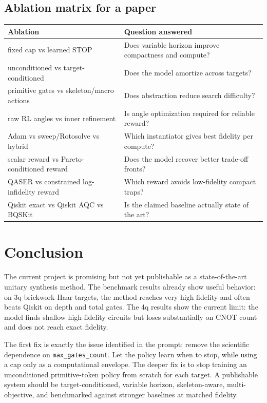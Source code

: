 \documentclass[11pt,a4paper]{article}
\begin{document}
\subsection{Ablation matrix for a paper}

\begin{center}
\small
\begin{tabularx}{\textwidth}{lX}
\toprule
Ablation & Question answered \\
\midrule
fixed cap vs learned STOP & Does variable horizon improve compactness and compute? \\
unconditioned vs target-conditioned & Does the model amortize across targets? \\
primitive gates vs skeleton/macro actions & Does abstraction reduce search difficulty? \\
raw RL angles vs inner refinement & Is angle optimization required for reliable reward? \\
Adam vs sweep/Rotosolve vs hybrid & Which instantiator gives best fidelity per compute? \\
scalar reward vs Pareto-conditioned reward & Does the model recover better trade-off fronts? \\
QASER vs constrained log-infidelity reward & Which reward avoids low-fidelity compact traps? \\
Qiskit exact vs Qiskit AQC vs BQSKit & Is the claimed baseline actually state of the art? \\
\bottomrule
\end{tabularx}
\end{center}

\section{Conclusion}

The current project is promising but not yet publishable as a state-of-the-art
unitary synthesis method. The benchmark results already show useful behavior:
on 3q brickwork-Haar targets, the method reaches very high fidelity and often
beats Qiskit on depth and total gates. The 4q results show the current limit:
the model finds shallow high-fidelity circuits but loses substantially on CNOT
count and does not reach exact fidelity.

The first fix is exactly the issue identified in the prompt: remove the
scientific dependence on \texttt{max\_gates\_count}. Let the policy learn
when to stop, while using a cap only as a computational envelope. The deeper
fix is to stop training an unconditioned primitive-token policy from scratch
for each target. A publishable system should be target-conditioned, variable
horizon, skeleton-aware, multi-objective, and benchmarked against stronger
baselines at matched fidelity.
\end{document}
